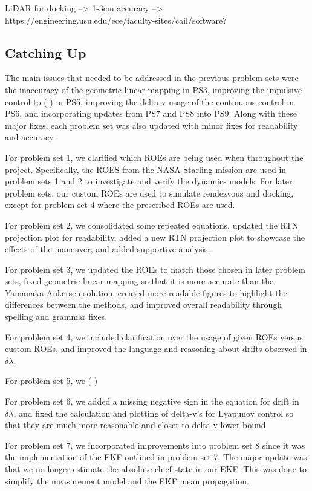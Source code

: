 LiDAR for docking --> 1-3cm accuracy --> https://engineering.usu.edu/ece/faculty-sites/cail/software?

\subsection{Catching Up}
The main issues that needed to be addressed in the previous problem sets were the inaccuracy of the geometric linear mapping in PS3, improving the impulsive control to (   ) in PS5, improving the delta-v usage of the continuous control in PS6, and incorporating updates from PS7 and PS8 into PS9. Along with these major fixes, each problem set was also updated with minor fixes for readability and accuracy.

For problem set 1, we clarified which ROEs are being used when throughout the project. Specifically, the ROES from the NASA Starling mission are used in problem sets 1 and 2 to investigate and verify the dynamics models. For later problem sets, our custom ROEs are used to simulate rendezvous and docking, except for problem set 4 where the prescribed ROEs are used.

For problem set 2, we consolidated some repeated equations, updated the RTN projection plot for readability, added a new RTN projection plot to showcase the effects of the maneuver, and added supportive analysis.

For problem set 3, we updated the ROEs to match those chosen in later problem sets, fixed geometric linear mapping so that it is more accurate than the Yamanaka-Ankersen solution, created more readable figures to highlight the differences between the methods, and  improved overall readability through spelling and grammar fixes.

For problem set 4, we included clarification over the usage of given ROEs versus custom ROEs, and improved the language and reasoning about drifts observed in $\delta \lambda$.

For problem set 5, we (   )

For problem set 6, we added a missing negative sign in the equation for drift in $\delta \lambda$, and fixed the calculation and plotting of delta-v's for Lyapunov control so that they are much more reasonable and closer to delta-v lower bound 

For problem set 7, we incorporated improvements into problem set 8 since it was the implementation of the EKF outlined in problem set 7. The major update was that we no longer estimate the absolute chief state in our EKF. This was done to simplify the measurement model and the EKF mean propagation. 

